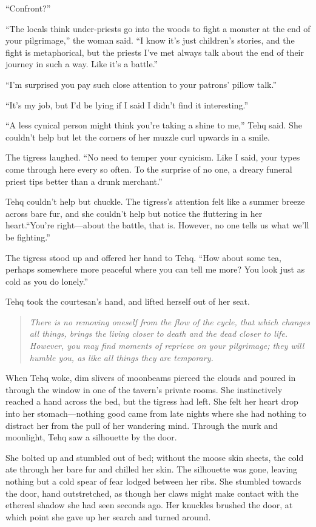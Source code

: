 ``Confront?''

``The locals think under-priests go into the woods to fight a monster at the end of your pilgrimage,'' the woman said. ``I know it's just children's stories, and the fight is metaphorical, but the priests I've met always talk about the end of their journey in such a way. Like it's a battle.''

``I'm surprised you pay such close attention to your patrons' pillow talk.''

``It's my job, but I'd be lying if I said I didn't find it interesting.''

``A less cynical person might think you're taking a shine to me,'' Tehq said. She couldn't help but let the corners of her muzzle curl upwards in a smile.

The tigress laughed. ``No need to temper your cynicism. Like I said, your types come through here every so often. To the surprise of no one, a dreary funeral priest tips better than a drunk merchant.''

Tehq couldn't help but chuckle. The tigress's attention felt like a summer breeze across bare fur, and she couldn't help but notice the fluttering in her heart.``You're right---about the battle, that is. However, no one tells us what we'll be fighting.''

The tigress stood up and offered her hand to Tehq. ``How about some tea, perhaps somewhere more peaceful where you can tell me more? You look just as cold as you do lonely.''

Tehq took the courtesan's hand, and lifted herself out of her seat.

\begin{quote}
\emph{There is no removing oneself from the flow of the cycle, that which changes all things, brings the living closer to death and the dead closer to life. However, you may find moments of reprieve on your pilgrimage; they will humble you, as like all things they are temporary.}
\end{quote}

\noindent When Tehq woke, dim slivers of moonbeams pierced the clouds and poured in through the window in one of the tavern's private rooms. She instinctively reached a hand across the bed, but the tigress had left. She felt her heart drop into her stomach---nothing good came from late nights where she had nothing to distract her from the pull of her wandering mind. Through the murk and moonlight, Tehq saw a silhouette by the door.

She bolted up and stumbled out of bed; without the moose skin sheets, the cold ate through her bare fur and chilled her skin. The silhouette was gone, leaving nothing but a cold spear of fear lodged between her ribs. She stumbled towards the door, hand outstretched, as though her claws might make contact with the ethereal shadow she had seen seconds ago. Her knuckles brushed the door, at which point she gave up her search and turned around.

